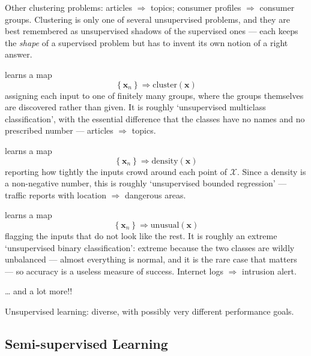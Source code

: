 Other clustering problems: articles \(\Rightarrow\) topics; consumer profiles
\(\Rightarrow\) consumer groups. Clustering is only one of several unsupervised
problems, and they are best remembered as unsupervised shadows of the supervised
ones --- each keeps the \emph{shape} of a supervised problem but has to invent
its own notion of a right answer.

\begin{definition}[Clustering]\label{def:clustering}
     learns a map
    \[
        \left\{ \bm{x}_n \right\} \Rightarrow \text{cluster}(\bm{x})
    \]
    assigning each input to one of finitely many groups, where the groups
    themselves are discovered rather than given. It is roughly `unsupervised
    multiclass classification', with the essential difference that the classes
    have no names and no prescribed number --- articles \(\Rightarrow\) topics.
\end{definition}

\begin{definition}\label{def:density}
     learns a map
    \[
        \left\{ \bm{x}_n \right\} \Rightarrow \text{density}(\bm{x})
    \]
    reporting how tightly the inputs crowd around each point of \(\mathcal{X}\).
    Since a density is a non-negative number, this is roughly `unsupervised
    bounded regression' --- traffic reports with location \(\Rightarrow\)
    dangerous areas.
\end{definition}

\begin{definition}\label{def:outlier}
     learns a map
    \[
        \left\{ \bm{x}_n \right\} \Rightarrow \text{unusual}(\bm{x})
    \]
    flagging the inputs that do not look like the rest. It is roughly an extreme
    `unsupervised binary classification': extreme because the two classes are
    wildly unbalanced --- almost everything is normal, and it is the rare case
    that matters --- so accuracy is a useless measure of success. Internet logs
    \(\Rightarrow\) intrusion alert.
\end{definition}

\ldots{} and a lot more!!

\begin{moral}
    Unsupervised learning: diverse, with possibly very different performance
    goals.
\end{moral}

\subsection{Semi-supervised Learning}


